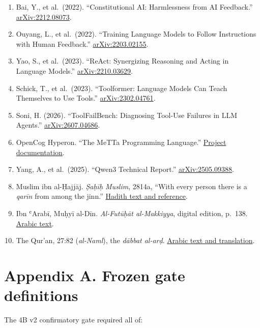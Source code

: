 \documentclass[
  11pt,
  letterpaper,
]{article}
\providecommand{\tightlist}{%
  \setlength{\itemsep}{0pt}\setlength{\parskip}{0pt}}
\begin{document}
\begin{enumerate}
\def\labelenumi{\arabic{enumi}.}
\tightlist
\item
  Bai, Y., et al.~(2022). ``Constitutional AI: Harmlessness from AI
  Feedback.'' \href{https://arxiv.org/abs/2212.08073}{arXiv:2212.08073}.
\item
  Ouyang, L., et al.~(2022). ``Training Language Models to Follow
  Instructions with Human Feedback.''
  \href{https://arxiv.org/abs/2203.02155}{arXiv:2203.02155}.
\item
  Yao, S., et al.~(2023). ``ReAct: Synergizing Reasoning and Acting in
  Language Models.''
  \href{https://arxiv.org/abs/2210.03629}{arXiv:2210.03629}.
\item
  Schick, T., et al.~(2023). ``Toolformer: Language Models Can Teach
  Themselves to Use Tools.''
  \href{https://arxiv.org/abs/2302.04761}{arXiv:2302.04761}.
\item
  Soni, H. (2026). ``ToolFailBench: Diagnosing Tool-Use Failures in LLM
  Agents.'' \href{https://arxiv.org/abs/2607.04686}{arXiv:2607.04686}.
\item
  OpenCog Hyperon. ``The MeTTa Programming Language.''
  \href{https://hyperon.opencog.org/}{Project documentation}.
\item
  Yang, A., et al.~(2025). ``Qwen3 Technical Report.''
  \href{https://arxiv.org/abs/2505.09388}{arXiv:2505.09388}.
\item
  Muslim ibn al-Ḥajjāj. \emph{Ṣaḥīḥ Muslim}, 2814a, ``With every person
  there is a \emph{qarīn} from among the jinn.''
  \href{https://sunnah.com/muslim:2814a}{Hadith text and reference}.
\item
  Ibn ʿArabī, Muḥyī al-Dīn. \emph{Al-Futūḥāt al-Makkiyya}, digital
  edition, p.~138.
  \href{https://ablibrary.net/book_content/1429/138}{Arabic text}.
\item
  The Qur'an, 27:82 (\emph{al-Naml}), the \emph{dābbat al-arḍ}.
  \href{https://quran.com/27/82}{Arabic text and translation}.
\end{enumerate}

\section{Appendix A. Frozen gate
definitions}\label{appendix-a.-frozen-gate-definitions}

The 4B v2 confirmatory gate required all of:
\end{document}
